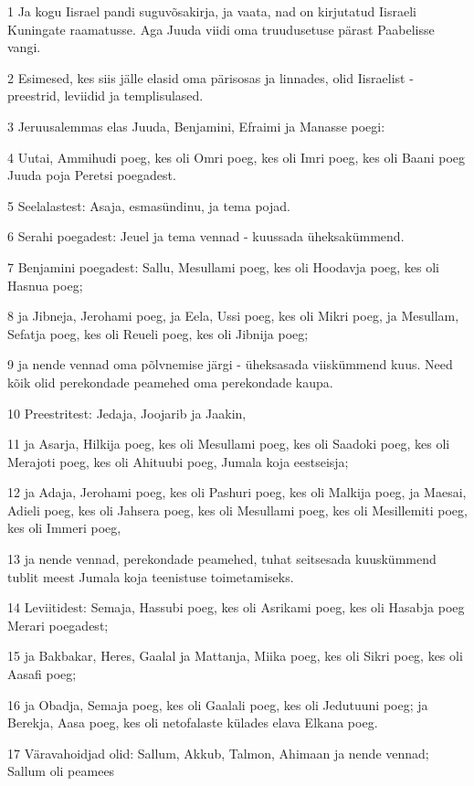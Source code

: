 \par 1 Ja kogu Iisrael pandi suguvõsakirja, ja vaata, nad on kirjutatud Iisraeli Kuningate raamatusse. Aga Juuda viidi oma truudusetuse pärast Paabelisse vangi.
\par 2 Esimesed, kes siis jälle elasid oma pärisosas ja linnades, olid Iisraelist - preestrid, leviidid ja templisulased.
\par 3 Jeruusalemmas elas Juuda, Benjamini, Efraimi ja Manasse poegi:
\par 4 Uutai, Ammihudi poeg, kes oli Omri poeg, kes oli Imri poeg, kes oli Baani poeg Juuda poja Peretsi poegadest.
\par 5 Seelalastest: Asaja, esmasündinu, ja tema pojad.
\par 6 Serahi poegadest: Jeuel ja tema vennad - kuussada üheksakümmend.
\par 7 Benjamini poegadest: Sallu, Mesullami poeg, kes oli Hoodavja poeg, kes oli Hasnua poeg;
\par 8 ja Jibneja, Jerohami poeg, ja Eela, Ussi poeg, kes oli Mikri poeg, ja Mesullam, Sefatja poeg, kes oli Reueli poeg, kes oli Jibnija poeg;
\par 9 ja nende vennad oma põlvnemise järgi - üheksasada viiskümmend kuus. Need kõik olid perekondade peamehed oma perekondade kaupa.
\par 10 Preestritest: Jedaja, Joojarib ja Jaakin,
\par 11 ja Asarja, Hilkija poeg, kes oli Mesullami poeg, kes oli Saadoki poeg, kes oli Merajoti poeg, kes oli Ahituubi poeg, Jumala koja eestseisja;
\par 12 ja Adaja, Jerohami poeg, kes oli Pashuri poeg, kes oli Malkija poeg, ja Maesai, Adieli poeg, kes oli Jahsera poeg, kes oli Mesullami poeg, kes oli Mesillemiti poeg, kes oli Immeri poeg,
\par 13 ja nende vennad, perekondade peamehed, tuhat seitsesada kuuskümmend tublit meest Jumala koja teenistuse toimetamiseks.
\par 14 Leviitidest: Semaja, Hassubi poeg, kes oli Asrikami poeg, kes oli Hasabja poeg Merari poegadest;
\par 15 ja Bakbakar, Heres, Gaalal ja Mattanja, Miika poeg, kes oli Sikri poeg, kes oli Aasafi poeg;
\par 16 ja Obadja, Semaja poeg, kes oli Gaalali poeg, kes oli Jedutuuni poeg; ja Berekja, Aasa poeg, kes oli netofalaste külades elava Elkana poeg.
\par 17 Väravahoidjad olid: Sallum, Akkub, Talmon, Ahimaan ja nende vennad; Sallum oli peamees
